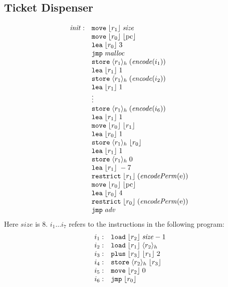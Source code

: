 \documentclass{article}
\newcommand{\var}[1]{\mathit{#1}}
\newcommand{\pcreg}{\mathrm{pc}}
\newcommand{\plainfun}[1]{\mathit{#1}}
\newcommand{\encode}{\plainfun{encode}}
\newcommand{\encodePerm}{\plainfun{encodePerm}}
\newcommand{\codelabel}[1]{\mathit{#1}}
\newcommand{\init}{\codelabel{init}}
\newcommand{\malloc}{\codelabel{malloc}}
\newcommand{\refreg}[1]{\lfloor #1 \rfloor}
\newcommand{\refheap}[1]{\langle #1 \rangle_h}
\newcommand{\instr}[1]{\mathtt{#1}}
\newcommand{\oneinstr}[2]{\instr{#1} \; #2}
\newcommand{\jmp}[1]{\oneinstr{jmp}{#1}}
\newcommand{\twoinstr}[3]{\instr{#1} \; #2 \; #3}
\newcommand{\move}[2]{\twoinstr{move}{#1}{#2}}
\newcommand{\store}[2]{\twoinstr{store}{#1}{#2}}
\newcommand{\load}[2]{\twoinstr{load}{#1}{#2}}
\newcommand{\lea}[2]{\twoinstr{lea}{#1}{#2}}
\newcommand{\threeinstr}[4]{\instr{#1} \; #2 \; #3 \; #4}
\newcommand{\restrict}[3]{\threeinstr{restrict}{#1}{#2}{#3}}
\newcommand{\plus}[3]{\threeinstr{plus}{#1}{#2}{#3}}
\newcommand{\plainperm}[1]{\mathrm{#1}}
\newcommand{\entry}{\plainperm{e}}
\begin{document}
\subsection{Ticket Dispenser}
\newcommand{\size}{\var{size}}
\label{sec:tick-disp}
\[
  \begin{array}{r l}
    \init: & \move{\refreg{r_1}}{\size} \\
           & \move{\refreg{r_0}}{\refreg{\pcreg}} \\
           & \lea{\refreg{r_0}}{3} \\
           & \jmp{\malloc} \\
           & \store{\refheap{r_1}}{(\encode(i_1))} \\
           & \lea{\refreg{r_1}}{1} \\
           & \store{\refheap{r_1}}{(\encode(i_2))} \\
           & \lea{\refreg{r_1}}{1} \\
           & \vdots \\
           & \store{\refheap{r_1}}{(\encode(i_6))} \\
           & \lea{\refreg{r_1}}{1} \\
           & \move{\refreg{r_0}}{\refreg{r_1}} \\
           & \lea{\refreg{r_0}}{1} \\
           & \store{\refheap{r_1}}{\refreg{r_0}} \\
           & \lea{\refreg{r_1}}{1} \\
           & \store{\refheap{r_1}}{0} \\
           & \lea{\refreg{r_1}}{-7} \\
           & \restrict{\refreg{r_1}}{(\encodePerm{(\entry)})} \\
           & \move{\refreg{r_0}}{\refreg{\pcreg}} \\
           & \lea{\refreg{r_0}}{4} \\
           & \restrict{\refreg{r_0}}{(\encodePerm{(\entry)})} \\
           & \jmp{\codelabel{adv}}
  \end{array}
\]
Here $\size$ is 8. $i_1 \dots i_7$ refers to the instructions in the following program:
\[
  \begin{array}{r l}
    i_1 :& \load{\refreg{r_2}}{\size-1} \\
    i_2 :& \load{\refreg{r_1}}{\refheap{r_2}} \\
    i_3 :& \plus{\refreg{r_3}}{\refreg{r_1}}{2} \\
    i_4 :& \store{\refheap{r_2}}{\refreg{r_3}} \\
    i_5 :& \move{\refreg{r_2}}{0} \\
    i_6 :& \jmp{\refreg{r_0}}
  \end{array}
\]
\end{document}
